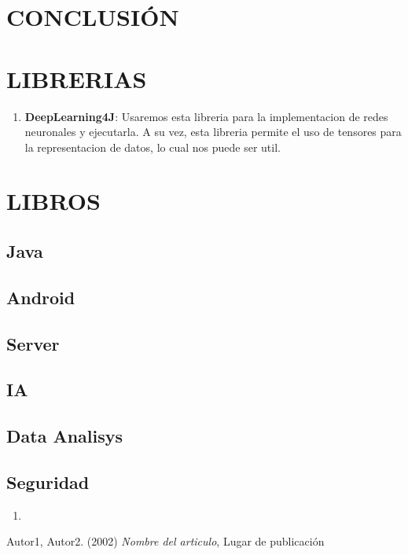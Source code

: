\documentclass{article}
\theoremstyle{definition}
\begin{document}
\section{CONCLUSIÓN}


\section{LIBRERIAS}

\begin{enumerate}
    \item \textbf{DeepLearning4J}: Usaremos esta libreria para la implementacion de redes neuronales y ejecutarla. A su vez, esta libreria permite el uso de tensores para la representacion de datos, lo cual nos puede ser util.
\end{enumerate}

\section{LIBROS}

\subsection{Java}

\subsection{Android}

\subsection{Server}

\subsection{IA}

\subsection{Data Analisys}

\subsection{Seguridad}


\begin{enumerate}
    \item 
\end{enumerate}

\begin{thebibliography}{9}
Autor1, Autor2. (2002) \textit{Nombre del articulo}, Lugar de publicación

\end{thebibliography}
\end{document}

